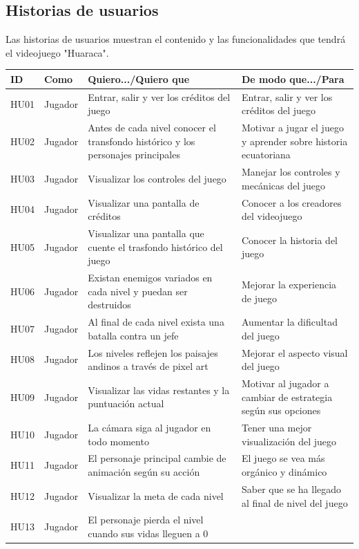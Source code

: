 \documentclass[a4paper, openright, 12pt]{report}
\begin{document}
\subsection*{Historias de usuarios}
\justify
Las historias de usuarios muestran el contenido y las funcionalidades que tendrá el videojuego "Huaraca".
\begin{longtable}{| l | l | p{5cm} | p{5cm} |}
\hline
\textbf{ID} & \textbf{Como} & \textbf{Quiero.../Quiero que} & \textbf{De modo que.../Para} \\ \hline
HU01 & Jugador &
Entrar, salir y ver los créditos del juego &
Entrar, salir y ver los créditos del juego \\ \hline
HU02 & Jugador &
Antes de cada nivel conocer el transfondo histórico y los personajes principales  &
Motivar a jugar el juego y aprender sobre historia ecuatoriana\\ \hline
HU03 & Jugador &
Visualizar los controles del juego &
Manejar los controles y mecánicas del juego \\ \hline
HU04 & Jugador &
Visualizar una pantalla de créditos &
Conocer a los creadores del videojuego\\ \hline
HU05 & Jugador &
Visualizar una pantalla que cuente el trasfondo histórico del juego &
Conocer la historia del juego \\ \hline
HU06 & Jugador &
Existan enemigos variados en cada nivel y puedan ser destruidos &
Mejorar la experiencia de juego \\ \hline
HU07 & Jugador &
Al final de cada nivel exista una batalla contra un jefe &
Aumentar la dificultad del juego \\ \hline
HU08 & Jugador &
Los niveles reflejen los paisajes andinos a través de pixel art &
Mejorar el aspecto visual del juego \\ \hline
HU09 & Jugador & 
Visualizar las vidas restantes y la puntuación actual &
Motivar al jugador a cambiar de estrategia según sus opciones \\ \hline
HU10 & Jugador &
La cámara siga al jugador en todo momento &
Tener una mejor visualización del juego \\ \hline
HU11 & Jugador &
El personaje principal cambie de animación según su acción &
El juego se vea más orgánico y dinámico \\ \hline
HU12 & Jugador &
Visualizar la meta de cada nivel &
Saber que se ha llegado al final de nivel del juego \\ \hline
HU13 & Jugador &
El personaje pierda el nivel cuando sus vidas lleguen a 0 &

\end{longtable}
\end{document}
